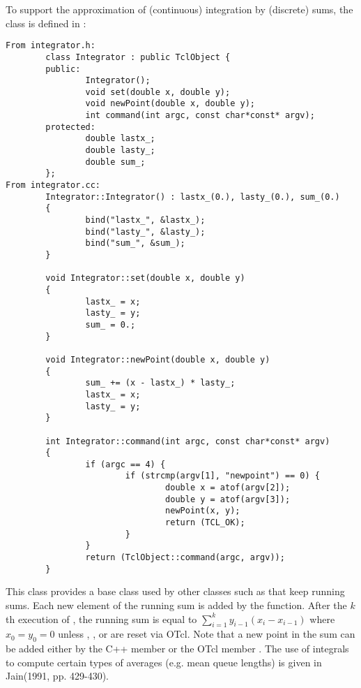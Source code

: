 To support the approximation of (continuous) integration by (discrete)
sums, the  class is defined in :
\begin{small}
\begin{verbatim}
From integrator.h:
        class Integrator : public TclObject {
        public:
                Integrator();
                void set(double x, double y);
                void newPoint(double x, double y);
                int command(int argc, const char*const* argv);
        protected:
                double lastx_;
                double lasty_;
                double sum_;
        };
From integrator.cc:
        Integrator::Integrator() : lastx_(0.), lasty_(0.), sum_(0.)
        {
                bind("lastx_", &lastx_);
                bind("lasty_", &lasty_);
                bind("sum_", &sum_);
        }

        void Integrator::set(double x, double y)
        {
                lastx_ = x;
                lasty_ = y;
                sum_ = 0.;
        }

        void Integrator::newPoint(double x, double y)
        {
                sum_ += (x - lastx_) * lasty_;
                lastx_ = x;
                lasty_ = y;
        }

        int Integrator::command(int argc, const char*const* argv)
        {
                if (argc == 4) {
                        if (strcmp(argv[1], "newpoint") == 0) {
                                double x = atof(argv[2]);
                                double y = atof(argv[3]);
                                newPoint(x, y);
                                return (TCL_OK);
                        }
                }
                return (TclObject::command(argc, argv));
        }
\end{verbatim}
\end{small}
This class provides a base class used by other classes such
as  that keep running sums.
Each new element of the running sum is added by
the  function.
After the $k$th execution of , the running sum
is equal to $\sum_{i=1}^{k}y_{i-1}(x_i - x_{i-1})$ where
$x_0 = y_0 = 0$ unless , , or 
are reset via OTcl.
Note that a new point in the sum can be added either by the
C++ member  or the OTcl member .
The use of integrals to compute certain types of averages
(e.g. mean queue lengths) is given in Jain(1991, pp. 429-430).
